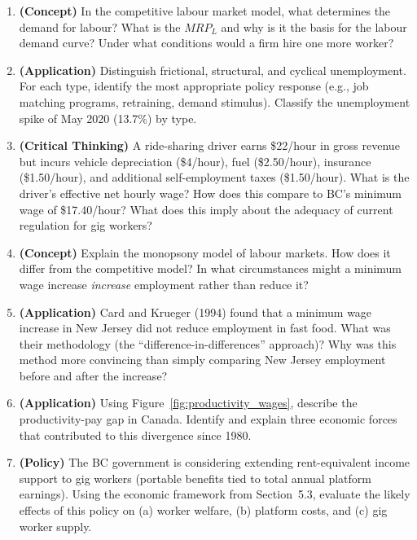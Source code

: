 \begin{enumerate}

\item \textbf{(Concept)} In the competitive labour market model, what determines the demand for labour? What is the $MRP_L$ and why is it the basis for the labour demand curve? Under what conditions would a firm hire one more worker?

\item \textbf{(Application)} Distinguish frictional, structural, and cyclical unemployment. For each type, identify the most appropriate policy response (e.g., job matching programs, retraining, demand stimulus). Classify the unemployment spike of May 2020 (13.7\%) by type.

\item \textbf{(Critical Thinking)} A ride-sharing driver earns \$22/hour in gross revenue but incurs vehicle depreciation (\$4/hour), fuel (\$2.50/hour), insurance (\$1.50/hour), and additional self-employment taxes (\$1.50/hour). What is the driver's effective net hourly wage? How does this compare to BC's minimum wage of \$17.40/hour? What does this imply about the adequacy of current regulation for gig workers?

\item \textbf{(Concept)} Explain the monopsony model of labour markets. How does it differ from the competitive model? In what circumstances might a minimum wage increase \textit{increase} employment rather than reduce it?

\item \textbf{(Application)} Card and Krueger (1994) found that a minimum wage increase in New Jersey did not reduce employment in fast food. What was their methodology (the ``difference-in-differences'' approach)? Why was this method more convincing than simply comparing New Jersey employment before and after the increase?

\item \textbf{(Application)} Using Figure~\ref{fig:productivity_wages}, describe the productivity-pay gap in Canada. Identify and explain three economic forces that contributed to this divergence since 1980.

\item \textbf{(Policy)} The BC government is considering extending rent-equivalent income support to gig workers (portable benefits tied to total annual platform earnings). Using the economic framework from Section~5.3, evaluate the likely effects of this policy on (a) worker welfare, (b) platform costs, and (c) gig worker supply.

\end{enumerate}

